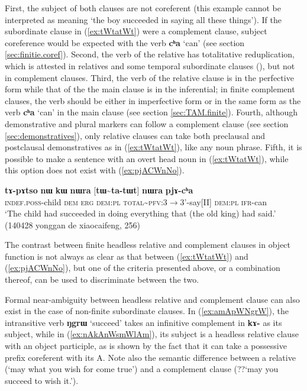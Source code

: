 \documentclass[oneside,a4paper,11pt]{article}
\newcommand{\ipa}[1]{\textbf{\phon#1}} %
\newcommand{\jpg}[2]{\ipa{#1} `#2'} %
\newcommand{\tld}{\textasciitilde{}}
\begin{document}
 First, the subject of both clauses are not coreferent (this example cannot be interpreted as meaning `the boy succeeded in saying all these things'). If the subordinate clause in (\ref{ex:tWtatWt}) were a complement clause, subject coreference would be expected with the verb 
\jpg{cʰa}{can} (see section \ref{sec:finitie.coref}). Second, the verb of the relative has totalitative reduplication, which is attested in relatives and some temporal subordinate clauses (\citealt[295]{jacques14linking}), but not in complement clauses. Third, the verb of the relative clause is in the perfective form while that of the the main clause is in the inferential; in finite complement clauses, the verb should be either in imperfective form or in the same form as the verb \jpg{cʰa}{can} in the main clause (see section \ref{sec:TAM.finite}). Fourth, although demonstrative and plural markers can follow a complement clause (see section \ref{sec:demonstratives}), only relative clauses can take both preclausal and postclausal demonstratives as in (\ref{ex:tWtatWt}), like any noun phrase. Fifth, it is possible to make a sentence with an overt head noun in (\ref{ex:tWtatWt}), while this option does not exist with (\ref{ex:pjACWnNo}). 

\begin{exe}
\ex \label{ex:tWtatWt}
\gll 
\ipa{tɤ-pɤtso} 	\ipa{nɯ} \ipa{kɯ}	\ipa{nɯra} 	[\ipa{tɯ\tld{}ta-tɯt}] 	\ipa{nɯra} 	\ipa{pjɤ-cʰa} \\
\textsc{indef.poss}-child \textsc{dem} \textsc{erg} \textsc{dem:pl} \textsc{total\tld{}pfv}:3$\rightarrow$3'-say[II] \textsc{dem:pl} \textsc{ifr}-can \\
\glt `The child had succeeded in doing everything that (the old king) had said.' (140428 yonggan de xiaocaifeng, 256)
\end{exe}

The contrast between finite headless relative and complement clauses in object function is not always as clear as that between (\ref{ex:tWtatWt}) and (\ref{ex:pjACWnNo}), but one of the criteria presented above, or a combination thereof, can be used to discriminate between the two.

Formal near-ambiguity between headless relative and complement clause can also exist in the case of non-finite subordinate clauses. In (\ref{ex:amApWNgrW}), the intransitive verb \jpg{ŋgrɯ}{succeed} takes an infinitive complement in \ipa{kɤ-} as its subject, while in (\ref{ex:nAkAnWsmWlAm}), its subject is a headless relative clause with an object participle, as is shown by the fact that it can take a possessive prefix coreferent with its A. Note also the semantic difference between a relative (`may what you wish for come true') and a complement clause (??`may you succeed to wish it.').
\end{document}

